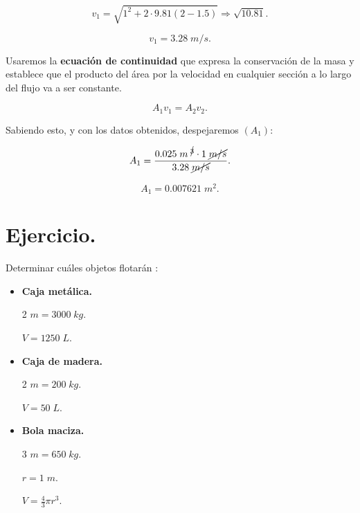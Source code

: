 \documentclass[a4paper,12pt]{article} %
\begin{document}
\[v_1 = \sqrt{1^2 + 2 \cdot 9.81 \left(2 - 1.5\right)} \Rightarrow \sqrt{10.81}. \]

\[\boxed{v_1 = 3.28 \; m/s.}\]

\begin{justify}
    Usaremos la \textbf{ecuación de continuidad} que expresa la conservación de la masa y establece que el producto del área por la velocidad 
    en cualquier sección a lo largo del flujo va a ser constante.
\end{justify}

\[A_1v_1 = A_2v_2.\]

\begin{justify}
    Sabiendo esto, y con los datos obtenidos, despejaremos \((A_1)\):
\end{justify}

\[A_1 = \frac{0.025 \; m^{\; \cancel{3}} \cdot 1 \; \cancel{m/s}}{3.28 \; \cancel{m/s}}.\]

\vspace{\baselineskip}

\[\boxed{ A_1 = 0.007621 \; m^2.}\]


\section{Ejercicio.}

\vspace{\baselineskip}

\begin{justify}
    Determinar cuáles  objetos flotarán :
\end{justify}

\begin{itemize}
    \item \textbf{Caja metálica.}
    \begin{multicols}{2}
        \(m = 3000 \; kg.\)

        \(V = 1250 \; L.\)
    \end{multicols}
    \item \textbf{Caja de madera.}
    \begin{multicols}{2}
        \(m = 200 \; kg.\)

        \(V = 50 \; L.\)
    \end{multicols}
    \item \textbf{Bola maciza.}
    \begin{multicols}{3}
        \(m = 650 \; kg.\)

        \(r = 1 \; m.\)

        \(V = \frac{4}{3} \pi r^3. \)
    \end{multicols}
\end{itemize}
\end{document}

